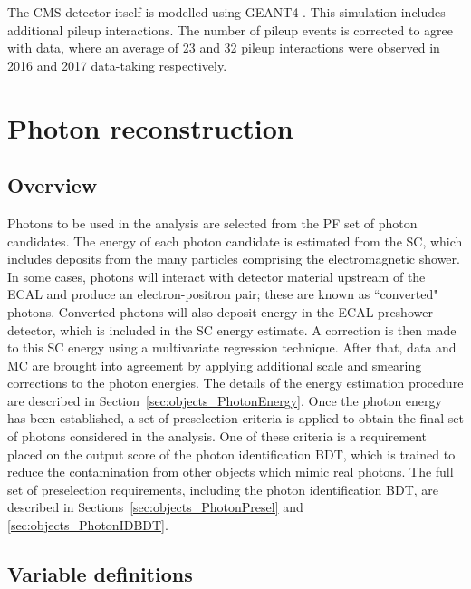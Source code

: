 The CMS detector itself is modelled using \textsc{GEANT4} \cite{Geant4}.
This simulation includes additional pileup interactions.
The number of pileup events is corrected to agree with data, 
where an average of 23 and 32 pileup interactions were observed in 2016 and 2017 data-taking respectively.

\section{Photon reconstruction}
\subsection{Overview}

Photons to be used in the \Hgg analysis are selected from the PF set of photon candidates.
The energy of each photon candidate is estimated from the SC, 
which includes deposits from the many particles comprising the electromagnetic shower.
In some cases, photons will interact with detector material upstream of the ECAL 
and produce an electron-positron pair; these are known as ``converted" photons.
Converted photons will also deposit energy in the ECAL preshower detector, 
which is included in the SC energy estimate.
A correction is then made to this SC energy using a multivariate regression technique.
After that, data and MC are brought into agreement by applying additional scale and smearing corrections to the photon energies.
The details of the energy estimation procedure are described in Section~\ref{sec:objects_PhotonEnergy}.
Once the photon energy has been established, 
a set of preselection criteria is applied to obtain the final set of photons considered in the analysis.
One of these criteria is a requirement placed on the output score of the photon identification BDT, 
which is trained to reduce the contamination from other objects which mimic real photons.
The full set of preselection requirements, including the photon identification BDT, 
are described in Sections~\ref{sec:objects_PhotonPresel} and \ref{sec:objects_PhotonIDBDT}.

\subsection{Variable definitions}

